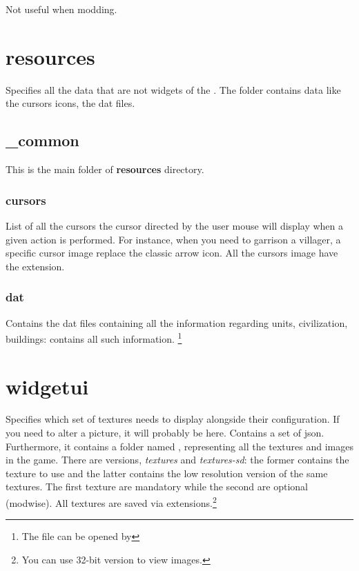 \begin{appendices}
    Not useful when modding.

    \section{resources}

    Specifies all the data that are not widgets of the . The folder contains data like the cursors icons, the \genie{} dat files.

    \subsection{\_common}

    This is the main folder of \textbf{resources} directory.

    \subsubsection{cursors}

    List of all the cursors the cursor directed by the user mouse will display when a given action is performed. For instance, when you need to garrison a villager, a specific cursor image replace the classic arrow icon. All the cursors image have the  extension.

    \subsubsection{dat}

    Contains the dat files containing all the information regarding units, civilization, buildings:  contains all such information. \footnote{The file can be opened by \genie{}}

    \section{widgetui}

    Specifies which set of textures \aoe{} needs to display alongside their configuration. If you need to alter a picture, it will probably be here.
    Contains a set of json.
    Furthermore, it contains a folder named , representing all the textures and images in the game. There are versions, \textit{textures} and \textit{textures-sd}: the former contains the texture to use and the latter contains the low resolution version of the same textures. The first texture are mandatory while the second are optional (modwise). All textures are saved via  extensions.\footnote{You can use  32-bit version to view  images.}


\end{appendices}
